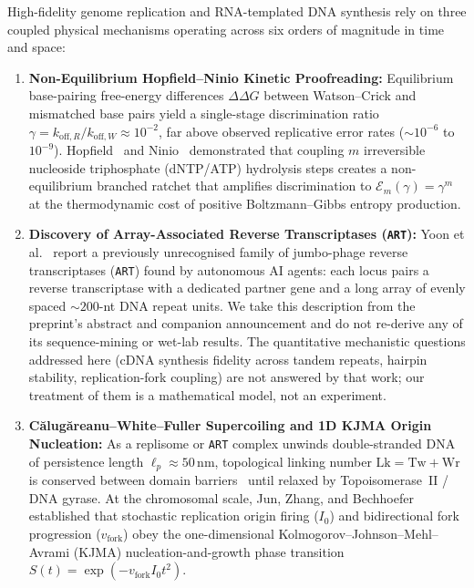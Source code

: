 \documentclass[11pt,a4paper]{article}
\theoremstyle{definition}
\begin{document}
High-fidelity genome replication and RNA-templated DNA synthesis rely on three coupled physical mechanisms operating across six orders of magnitude in time and space:
\begin{enumerate}
  \item \textbf{Non-Equilibrium Hopfield--Ninio Kinetic Proofreading:} Equilibrium base-pairing free-energy differences $\Delta\Delta G$ between Watson--Crick and mismatched base pairs yield a single-stage discrimination ratio $\gamma = k_{\mathrm{off},R}/k_{\mathrm{off},W} \approx 10^{-2}$, far above observed replicative error rates ($\sim 10^{-6}$ to $10^{-9}$). Hopfield~\cite{hopfield1974} and Ninio~\cite{ninio1975} demonstrated that coupling $m$ irreversible nucleoside triphosphate (dNTP/ATP) hydrolysis steps creates a non-equilibrium branched ratchet that amplifies discrimination to $\mathcal{E}_m(\gamma) = \gamma^m$ at the thermodynamic cost of positive Boltzmann--Gibbs entropy production.
  \item \textbf{Discovery of Array-Associated Reverse Transcriptases (\texttt{ART}):} Yoon et al.~\cite{yoon2026art} report a previously unrecognised family of jumbo-phage reverse transcriptases (\texttt{ART}) found by autonomous AI agents: each locus pairs a reverse transcriptase with a dedicated partner gene and a long array of evenly spaced $\sim 200$-nt DNA repeat units. We take this description from the preprint's abstract and companion announcement and do not re-derive any of its sequence-mining or wet-lab results. The quantitative mechanistic questions addressed here (cDNA synthesis fidelity across tandem repeats, hairpin stability, replication-fork coupling) are not answered by that work; our treatment of them is a mathematical model, not an experiment.
  \item \textbf{C\u{a}lug\u{a}reanu--White--Fuller Supercoiling and 1D KJMA Origin Nucleation:} As a replisome or \texttt{ART} complex unwinds double-stranded DNA of persistence length $\ell_p \approx 50\,\mathrm{nm}$, topological linking number $\mathrm{Lk} = \mathrm{Tw} + \mathrm{Wr}$ is conserved between domain barriers~\cite{calugareanu1959,fuller1971} until relaxed by Topoisomerase~II / DNA gyrase. At the chromosomal scale, Jun, Zhang, and Bechhoefer~\cite{bechhoefer2005kjma} established that stochastic replication origin firing ($I_0$) and bidirectional fork progression ($v_{\mathrm{fork}}$) obey the one-dimensional Kolmogorov--Johnson--Mehl--Avrami (KJMA) nucleation-and-growth phase transition $S(t) = \exp(-v_{\mathrm{fork}} I_0 t^2)$.
\end{enumerate}
\end{document}
